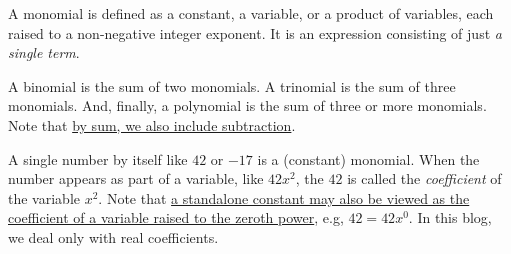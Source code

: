 \documentclass[
  a4paper,
]{article}
\begin{document}
A monomial is defined as a constant, a variable, or a product of
variables, each raised to a non-negative integer exponent. It is an
expression consisting of just \emph{a single term}.

A binomial is the sum of two monomials. A trinomial is the sum of three
monomials. And, finally, a polynomial is the sum of three or more
monomials. Note that
\href{https://swanlotus.netlify.app/blogs/the-two-most-important-numbers-zero-and-one}{by
sum, we also include subtraction}.

A single number by itself like \(42\) or \(-17\) is a (constant)
monomial. When the number appears as part of a variable, like \(42x^2\),
the \(42\) is called the \emph{coefficient} of the variable \(x^2\).
Note that
\href{https://swanlotus.netlify.app/blogs/the-two-most-important-numbers-zero-and-one}{a
standalone constant may also be viewed as the coefficient of a variable
raised to the zeroth power}, e.g, \(42 = 42x^{0}\). In this blog, we
deal only with real coefficients.
\end{document}
